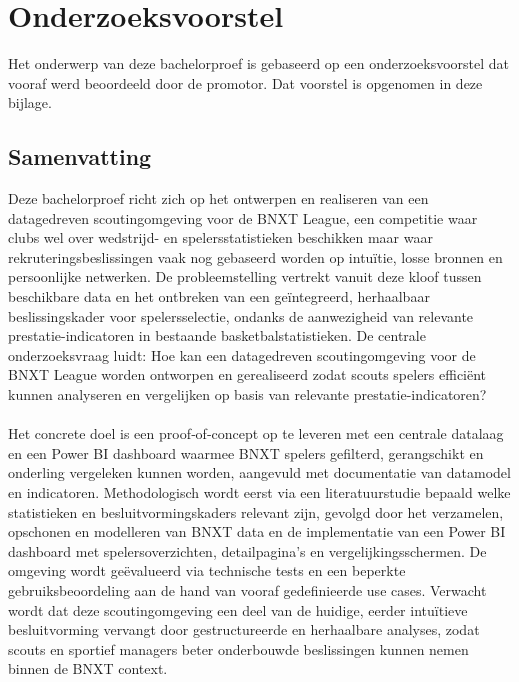 \documentclass[dutch,dit,thesis]{hogentreport}
\begin{document}











\appendix

\chapter{Onderzoeksvoorstel}

Het onderwerp van deze bachelorproef is gebaseerd op een onderzoeksvoorstel dat vooraf werd beoordeeld door de promotor. Dat voorstel is opgenomen in deze bijlage.

\section*{Samenvatting}
Deze bachelorproef richt zich op het ontwerpen en realiseren van een datagedreven scoutingomgeving voor de BNXT League, een competitie waar clubs wel over wedstrijd- en spelersstatistieken beschikken maar waar rekruteringsbeslissingen vaak nog gebaseerd worden op intuïtie, losse bronnen en persoonlijke netwerken. De probleemstelling vertrekt vanuit deze kloof tussen beschikbare data en het ontbreken van een geïntegreerd, herhaalbaar beslissingskader voor spelersselectie, ondanks de aanwezigheid van relevante prestatie-indicatoren in bestaande basketbalstatistieken. De centrale onderzoeksvraag luidt: Hoe kan een datagedreven scoutingomgeving voor de BNXT League worden ontworpen en gerealiseerd zodat scouts spelers efficiënt kunnen analyseren en vergelijken op basis van relevante prestatie-indicatoren? 
\\\\
Het concrete doel is een proof‑of‑concept op te leveren met een centrale datalaag en een Power BI dashboard waarmee BNXT spelers gefilterd, gerangschikt en onderling vergeleken kunnen worden, aangevuld met documentatie van datamodel en indicatoren. Methodologisch wordt eerst via een literatuurstudie bepaald welke statistieken en besluitvormingskaders relevant zijn, gevolgd door het verzamelen, opschonen en modelleren van BNXT data en de implementatie van een Power BI dashboard met spelersoverzichten, detailpagina’s en vergelijkingsschermen. De omgeving wordt geëvalueerd via technische tests en een beperkte gebruiksbeoordeling aan de hand van vooraf gedefinieerde use cases. Verwacht wordt dat deze scoutingomgeving een deel van de huidige, eerder intuïtieve besluitvorming vervangt door gestructureerde en herhaalbare analyses, zodat scouts en sportief managers beter onderbouwde beslissingen kunnen nemen binnen de BNXT context.
\end{document}
